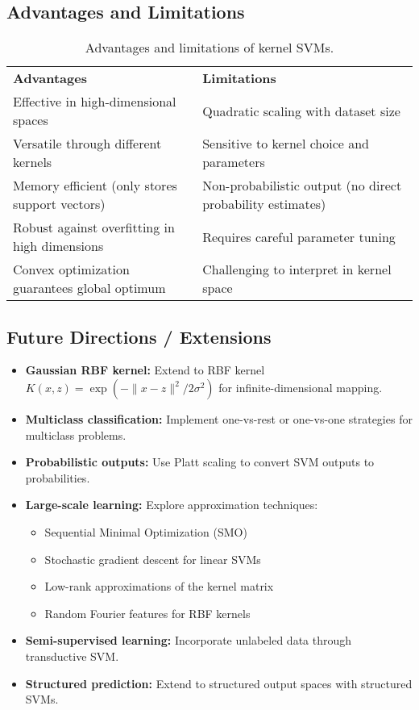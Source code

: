 \documentclass[11pt]{article}
\begin{document}
\subsection{Advantages and Limitations}
\begin{table}[h]
  \centering
  \begin{tabular}{p{}p{}}
    \textbf{Advantages} & \textbf{Limitations} \\
    Effective in high-dimensional spaces & Quadratic scaling with dataset size \\
    Versatile through different kernels & Sensitive to kernel choice and parameters \\
    Memory efficient (only stores support vectors) & Non-probabilistic output (no direct probability estimates) \\
    Robust against overfitting in high dimensions & Requires careful parameter tuning \\
    Convex optimization guarantees global optimum & Challenging to interpret in kernel space \\
  \end{tabular}
  \caption{Advantages and limitations of kernel SVMs.}
\end{table}

\subsection{Future Directions / Extensions}
\begin{itemize}
  \item \textbf{Gaussian RBF kernel:} Extend to RBF kernel $K(x,z)=\exp(-\|x-z\|^2/2\sigma^2)$ for infinite-dimensional mapping.
  \item \textbf{Multiclass classification:} Implement one-vs-rest or one-vs-one strategies for multiclass problems.
  \item \textbf{Probabilistic outputs:} Use Platt scaling to convert SVM outputs to probabilities.
  \item \textbf{Large-scale learning:} Explore approximation techniques:
    \begin{itemize}
        \item Sequential Minimal Optimization (SMO)
        \item Stochastic gradient descent for linear SVMs
        \item Low-rank approximations of the kernel matrix
        \item Random Fourier features for RBF kernels
    \end{itemize}
  \item \textbf{Semi-supervised learning:} Incorporate unlabeled data through transductive SVM.
  \item \textbf{Structured prediction:} Extend to structured output spaces with structured SVMs.
\end{itemize}
\end{document}
